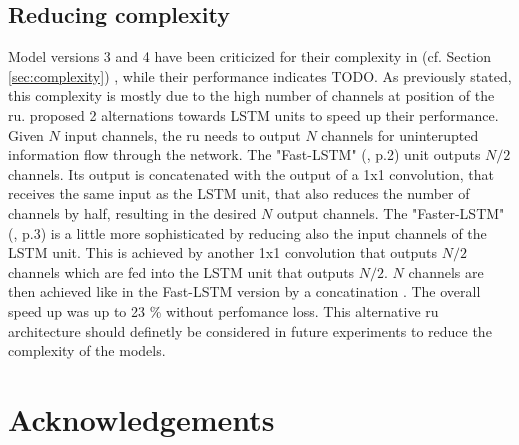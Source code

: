 \documentclass[11pt,
  paper=a4, 
  bibliography=totocnumbered,
	captions=tableheading,
	BCOR=10mm
]{scrreprt}
\theoremstyle{definition}
\newcommand{\secref}[1]{%
	\IfBeginWith{#1}{chap:}{%
		(cf. Chapter \ref{#1})}%
		{(cf. Section \ref{#1})}%
		}
\begin{document}
\section{Reducing complexity}
Model versions 3 and 4 have been criticized for their complexity in \secref{sec:complexity}, while their performance indicates TODO.
As previously stated, this complexity is mostly due to the high number of channels at position of the \gls{ru}.
\cite{Pfeuffer2020} proposed 2 alternations towards LSTM units to speed up their performance.
Given $N$ input channels, the \gls{ru} needs to output $N$ channels for uninterupted information flow through the network.
The "Fast-LSTM" (\cite{Pfeuffer2020}, p.2) unit outputs $N/2$ channels.
Its output is concatenated with the output of a 1x1 convolution, that receives the same input as the LSTM unit, that also reduces the number of channels by half, resulting in the desired $N$ output channels.
The "Faster-LSTM" (\cite{Pfeuffer2020}, p.3) is a little more sophisticated by reducing also the input channels of the LSTM unit.
This is achieved by another 1x1 convolution that outputs $N/2$ channels which are fed into the LSTM unit that outputs $N/2$.
$N$ channels are then achieved like in the Fast-LSTM version by a concatination \cite{Pfeuffer2020}.
The overall speed up was up to 23 \% without perfomance loss.
This alternative \gls{ru} architecture should definetly be considered in future experiments to reduce the complexity of the models.


\chapter*{Acknowledgements}







\glsaddall
\printglossaries

\printbibliography
\end{document}

